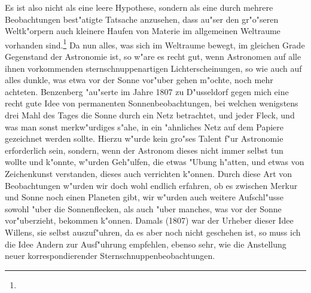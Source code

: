 \documentclass[a4paper, 11pt, oneside, polutonikogreek, german]{article}
\begin{document}
Es ist also nicht als eine leere Hypothese, sondern als eine durch mehrere Beobachtungen best"atigte Tatsache anzusehen, dass au"ser den gr"o"seren Weltk"orpern auch kleinere Haufen von Materie im allgemeinen Weltraume vorhanden sind.\footnote{} Da nun alles, was sich im Weltraume bewegt, im gleichen Grade Gegenstand der Astronomie ist, so w"are es recht gut, wenn Astronomen auf alle ihnen vorkommenden sternschnuppenartigen Lichterscheinungen, so wie auch auf alles dunkle, was etwa vor der Sonne vor"uber gehen m"ochte, noch mehr achteten. Benzenberg "au"serte im Jahre 1807 zu D"usseldorf gegen mich eine recht gute Idee von permanenten Sonnenbeobachtungen, bei welchen wenigstens drei Mahl des Tages die Sonne durch ein Netz betrachtet, und jeder Fleck, und was man sonst merkw"urdiges s"ahe, in ein "ahnliches Netz auf dem Papiere gezeichnet werden sollte. Hierzu w"urde kein gro"ses Talent f"ur Astronomie erforderlich sein, sondern, wenn der Astronom dieses nicht immer selbst tun wollte und k"onnte, w"urden Geh"ulfen, die etwas "Ubung h"atten, und etwas von Zeichenkunst verstanden, dieses auch verrichten k"onnen. Durch diese Art von Beobachtungen w"urden wir doch wohl endlich erfahren, ob es zwischen Merkur und Sonne noch einen Planeten gibt, wir w"urden auch weitere Aufschl"usse sowohl "uber die Sonnenflecken, als auch "uber manches, was vor der Sonne vor"uberzieht, bekommen k"onnen. Damals (1807) war der Urheber dieser Idee Willens, sie selbst auszuf"uhren, da es aber noch nicht geschehen ist, so muss ich die Idee Andern zur Ausf"uhrung empfehlen, ebenso sehr, wie die Anstellung neuer korrespondierender Sternschnuppenbeobachtungen. 
\end{document}

